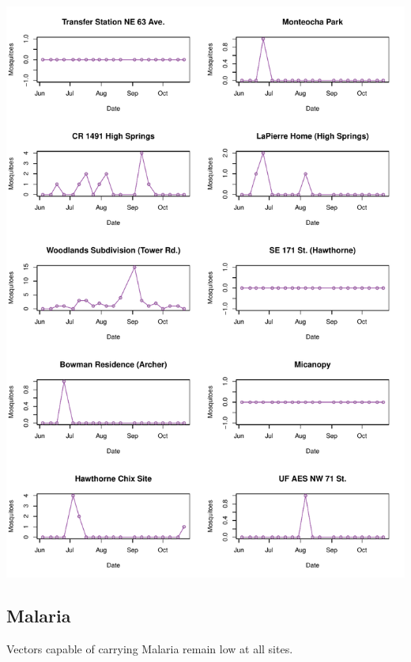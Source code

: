 \documentclass{article}
\begin{document}
\begin{center}
\includegraphics{mosq28oct13-011}
\newpage
\subsection*{Malaria}

\end{center}

Vectors capable of carrying Malaria remain low at all sites.\\
\end{document}
